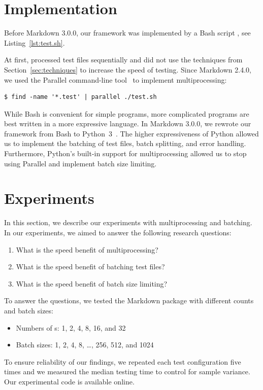 \documentclass[final]{ltugboat}
\begin{document}
\section{Implementation}
\label{sec:implementation}

Before Markdown 3.0.0, our framework was implemented by a Bash script , see Listing~\ref{lst:test.sh}.

At first,  processed test files sequentially and did not use the techniques from Section~\ref{sec:techniques} to increase the speed of testing. Since Markdown 2.4.0, we used the  Parallel command-line tool~\cite{tange2011gnu} to implement multiprocessing:

\begin{verbatim}
$ find -name '*.test' | parallel ./test.sh
\end{verbatim}

While Bash is convenient for simple programs, more complicated programs are best written in a more expressive language. In Markdown 3.0.0, we rewrote our framework from Bash to Python~3~\cite{novotny2023implement}. The higher expressiveness of Python allowed us to implement the batching of test files, batch splitting, and error handling. Furthermore, Python's built-in support for multiprocessing allowed us to stop using  Parallel and implement batch size limiting.

\section{Experiments}
\label{sec:experiments}

In this section, we describe our experiments with multiprocessing and batching. In our experiments, we aimed to answer the following research questions:
\begin{enumerate}
\item What is the speed benefit of multiprocessing?
\item What is the speed benefit of batching test files?
\item What is the speed benefit of batch size limiting?
\end{enumerate}
To answer the questions, we tested the Markdown package with different  counts and batch sizes:
\begin{itemize}
\item Numbers of s: 1, 2, 4, 8, 16, and 32
\item Batch sizes: 1, 2, 4, 8, \ldots, 256, 512, and 1024
\end{itemize}
To ensure reliability of our findings, we repeated each test configuration five times and we measured the median testing time to control for sample variance. Our experimental code is available online.~\cite{starynovotny2023measure}
\end{document}
